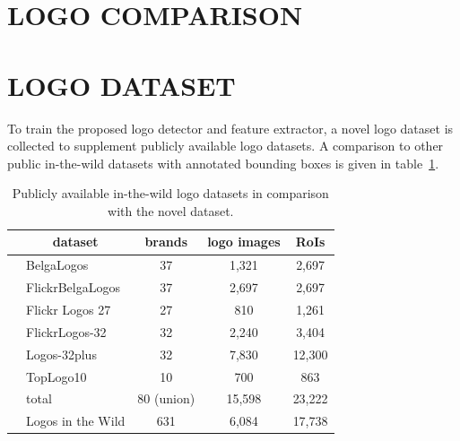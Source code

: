 \documentclass[a4paper,twoside]{article}
\newcommand{\vertboxs}[1]{\rotatebox{90}{\parbox{14mm}{\centering #1}}}
\newcommand{\vertboxt}[1]{\rotatebox{90}{\parbox{10mm}{\centering #1}}}
\begin{document}

\section{\uppercase{Logo Comparison}}


\section{\uppercase{Logo Dataset}}
\noindent To train the proposed logo detector and feature extractor, a novel logo dataset is collected to supplement publicly available logo datasets. A comparison to other public in-the-wild datasets with annotated bounding boxes is given in table~\ref{tab:logoDatasets}.
%
\begin{table}[t]
\centering
\caption{Publicly available in-the-wild logo datasets in comparison with the novel dataset.}
\label{tab:logoDatasets}
\begin{small}
\begin{tabular}{cl|ccc}
& \multicolumn{1}{c|}{\textbf{dataset}} & \textbf{brands} & \textbf{logo images} & \textbf{RoIs} \bigstrut[b]\\
\hline
\multirow{8}{*}{\vertboxs{public}} & BelgaLogos \cite{joly2009,letessier2012} & 37 & 1,321 & 2,697 \bigstrut[t] \\
& FlickrBelgaLogos \cite{letessier2012} & 37 & 2,697 & 2,697 \\
& Flickr Logos 27 \cite{kalantidis2011} & 27 & 810 & 1,261 \\
& FlickrLogos-32 \cite{romberg2011} & 32 & 2,240 & 3,404 \\
& Logos-32plus \cite{bianco2015,bianco2017} & 32 & 7,830 & 12,300 \\
& TopLogo10 \cite{su2016} & 10 & 700 & 863 \bigstrut[b] \\
\cline{2-5}
& total & 80 (union) & 15,598 & 23,222 \bigstrut \\
\hline
\begin{minipage}[c]{0.1cm}\vertboxt{new}\end{minipage} & Logos in the Wild & 631 & 6,084 & 17,738 \bigstrut[t]
\end{tabular}
\end{small}
\end{table}
\end{document}
